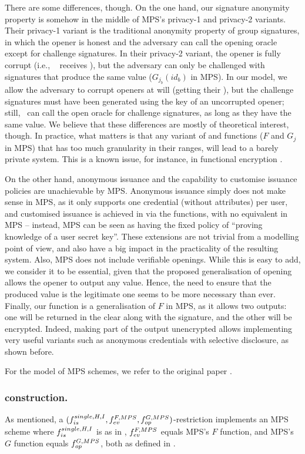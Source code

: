 There are some differences, though. On the one hand, our signature anonymity
property is somehow in the middle of MPS's privacy-1 and privacy-2 variants.
Their privacy-1 variant is the traditional anonymity property of group
signatures, in which the opener is honest and the adversary can call the opening
oracle except for challenge signatures. In their privacy-2 variant, the opener
is fully corrupt (i.e., \adv~ receives \osk), but the adversary can only be
challenged with signatures that produce the same \yinsp value ($G_{j_b}(id_b)$
in MPS). In our \UAS model, we allow the adversary to corrupt openers at will
(getting their \osk), but the challenge signatures must have been generated using
the key of an uncorrupted opener; still, \adv~can call the open oracle for
challenge signatures, as long as they have the same \yinsp value. We believe
that these differences are mostly of theoretical interest, though. In practice,
what matters is that any variant of \feval and \finsp functions ($F$ and $G_j$
in MPS) that has too much granularity in their ranges, will lead to a barely
private system. This is a known issue, for instance, in functional encryption
\cite{bsw11}.

On the other hand, anonymous issuance and the capability to customise issuance
policies are unachievable by MPS. Anonymous issuance simply does not make sense
in MPS, as it only supports one credential (without attributes) per user, and
customised issuance is achieved in \UAS via the \fissue functions, with no
equivalent in MPS -- instead, MPS can be seen as having the fixed policy of
``proving knowledge of a user secret key''. These extensions are not trivial
from a modelling point of view, and also have a big impact in the practicality
of the resulting system. Also, MPS does not include verifiable openings. While
this is easy to add, we consider it to be essential, given that the proposed
generalisation of opening allows the opener to output any value. Hence, the
need to ensure that the produced value is the legitimate one seems to be more
necessary than ever. Finally, our \feval function is a generalisation of $F$ in
MPS, as it allows two outputs: one will be returned in the clear along with the
signature, and the other will be encrypted. Indeed, making part of the output
unencrypted allows implementing very useful variants such as anonymous
credentials with selective disclosure, as shown before.

For the model of MPS schemes, we refer to the original paper \cite{ngsy22}.

\subsubsection{\CUASMPS construction.} %
As mentioned, a $(f_{is}^{single,H,I},f_{ev}^{F,MPS},
f_{op}^{G,MPS})$-restriction implements an MPS scheme where
$f_{is}^{single,H,I}$ is as in , $f_{ev}^{F,MPS}$
equals MPS's $F$ function, and MPS's $G$ function equals $f_{op}^{G,MPS}$, both
as defined in .

